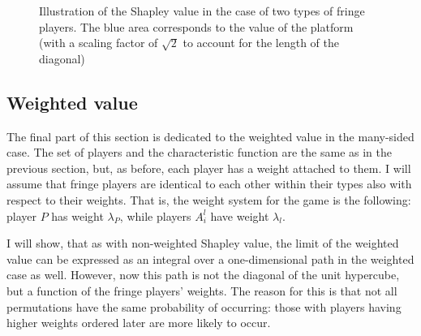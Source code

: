 \documentclass[a4paper]{article}
\begin{document}
\begin{figure}
    \centering
    \caption{Illustration of the Shapley value in the case of two types of fringe players. The blue area corresponds to the value of the platform (with a scaling factor of $\sqrt{2}$ to account for the length of the diagonal)}
    \label{fig:many_sided_shapley}
\end{figure}


\subsection{Weighted value}

The final part of this section is dedicated to the weighted value in the many-sided case.
The set of players and the characteristic function are the same as in the previous section, but, as before, each player has a weight attached to them.
I will assume that fringe players are identical to each other within their types also with respect to their weights.
That is, the weight system for the game is the following: player $P$ has weight $\lambda_P$, while players $A^l_i$ have weight $\lambda_l$.

I will show, that as with non-weighted Shapley value, the limit of the weighted value can be expressed as an integral over a one-dimensional path in the weighted case as well.
However, now this path is not the diagonal of the unit hypercube, but a function of the fringe players' weights.
The reason for this is that not all permutations have the same probability of occurring: those with players having higher weights ordered later are more likely to occur.
\end{document}
